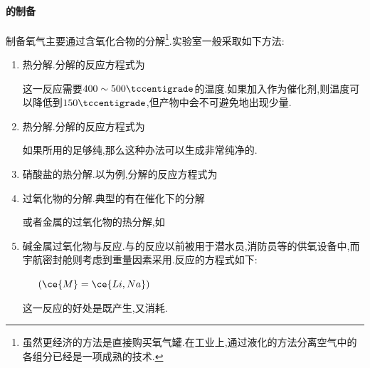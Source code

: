 \documentclass{ctexart}
\begin{document}
\paragraph{的制备}
制备氧气主要通过含氧化合物的分解\footnote{虽然更经济的方法是直接购买氧气罐.在工业上,通过液化的方法分离空气中的各组分已经是一项成熟的技术.}.实验室一般采取如下方法:
\begin{enumerate}[label=\tbf{\arabic*},topsep=0pt,parsep=0pt,itemsep=0pt,partopsep=0pt]
    \item 热分解.分解的反应方程式为
        \begin{center}
        \end{center}
        这一反应需要$400\sim500\tccentigrade$的温度.如果加入作为催化剂,则温度可以降低到$150\tccentigrade$,但产物中会不可避免地出现少量.
    \item 热分解.分解的反应方程式为
        \begin{center}
        \end{center}
        如果所用的足够纯,那么这种办法可以生成非常纯净的.
    \item 硝酸盐的热分解.以为例,分解的反应方程式为
        \begin{center}
        \end{center}
    \item 过氧化物的分解.典型的有在催化下的分解
        \begin{center}
        \end{center}
        或者金属的过氧化物的热分解,如
        \begin{center}
        \end{center}
    \item 碱金属过氧化物与反应.与的反应以前被用于潜水员,消防员等的供氧设备中,而宇航密封舱则考虑到重量因素采用.反应的方程式如下:
        \begin{center}
            \ \ \ $\left(\ce{M}=\ce{Li,Na}\right)$
        \end{center}
        这一反应的好处是既产生,又消耗.
\end{enumerate}
\end{document}
